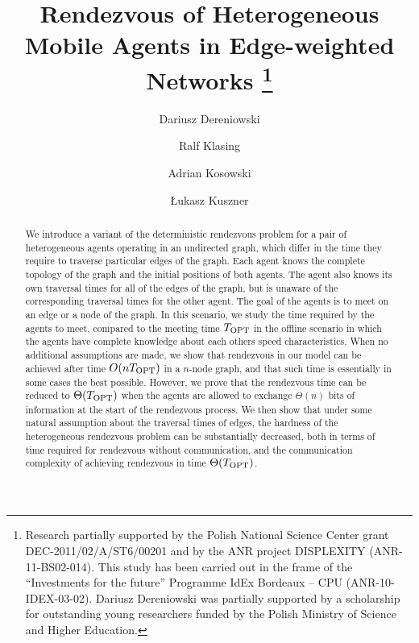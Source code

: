 \documentclass{llncs}
\newcommand{\Topts}{T_{\scriptsize \textup{OPT}}}
\begin{document}
\pagestyle{headings}  
\title{Rendezvous of Heterogeneous Mobile Agents in Edge-weighted Networks
\thanks{Research partially supported by the Polish National Science Center grant DEC-2011/02/A/ST6/00201
and by the ANR project DISPLEXITY (ANR-11-BS02-014). 
This study has been carried out in the frame of the ``Investments for 
the future'' Programme IdEx Bordeaux – CPU (ANR-10-IDEX-03-02).
Dariusz Dereniowski was partially supported by a scholarship for outstanding young researchers funded by the Polish Ministry of Science and Higher Education.}}


\author{Dariusz Dereniowski\and 
Ralf Klasing\and 
Adrian Kosowski 
\and
{\L}ukasz Kuszner}

 \maketitle

\begin{abstract}
We introduce a variant of the deterministic rendezvous problem for a 
pair of heterogeneous agents operating in an undirected graph, which 
differ in the time they require to traverse particular edges of the 
graph. Each agent knows the complete topology of the graph and 
the initial positions of both agents. The agent also knows its 
own traversal times for all of the edges of the graph, but is unaware of 
the corresponding traversal times for the other agent. The goal of the 
agents is to meet on an edge or a node of the graph. In this scenario, we 
study the time required by the agents to meet, compared to the meeting 
time $\Topts$ in the offline scenario in which the agents have complete 
knowledge about each others speed characteristics. When no additional 
assumptions are made, we show that rendezvous in our model can be 
achieved after time $O(n \Topts)$ in a $n$-node graph, and that such 
time is essentially in some cases the best possible. However, we prove 
that the rendezvous time can be reduced to $\Theta (\Topts)$ when the 
agents are allowed to exchange $\Theta(n)$ bits of information at the 
start of the rendezvous process. We then show that under some natural 
assumption about the traversal times of edges, the hardness of the 
heterogeneous rendezvous problem can be substantially decreased, both in 
terms of time required for rendezvous without communication, and the 
communication complexity of achieving rendezvous in time $\Theta (\Topts)$.
\end{abstract}
\end{document}

